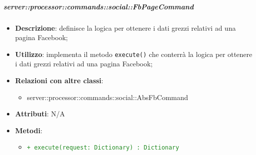         \subparagraph{server::processor::commands::social::FbPageCommand} %
        \label{subp:bdsm_app_server_processor_commands_social_fbpagecommand}
        \begin{itemize}
          \item \textbf{Descrizione}: definisce la logica per ottenere i dati grezzi relativi ad una pagina Facebook;
          \item \textbf{Utilizzo}: implementa il metodo \texttt{execute()} che conterrà la logica per ottenere i dati grezzi relativi ad una pagina Facebook;
          \item \textbf{Relazioni con altre classi}:
            \begin{itemize}
              \item server::processor::commands::social::AbsFbCommand
            \end{itemize}
          \item \textbf{Attributi}: N/A
          \item \textbf{Metodi}:
          \begin{itemize}
              \item \textcolor{forestgreen}{\texttt{+ execute(request: Dictionary) : Dictionary}}
          \end{itemize}
        \end{itemize}

